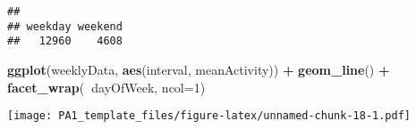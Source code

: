 \documentclass[]{article}
\newenvironment{Shaded}{\begin{snugshade}}{\end{snugshade}}
\newcommand{\DataTypeTok}[1]{\textcolor[rgb]{0.13,0.29,0.53}{#1}}
\newcommand{\DecValTok}[1]{\textcolor[rgb]{0.00,0.00,0.81}{#1}}
\newcommand{\KeywordTok}[1]{\textcolor[rgb]{0.13,0.29,0.53}{\textbf{#1}}}
\newcommand{\NormalTok}[1]{#1}
\newcommand{\OperatorTok}[1]{\textcolor[rgb]{0.81,0.36,0.00}{\textbf{#1}}}
\newcommand{\OtherTok}[1]{\textcolor[rgb]{0.56,0.35,0.01}{#1}}
\newcommand{\StringTok}[1]{\textcolor[rgb]{0.31,0.60,0.02}{#1}}
\begin{document}
\begin{Shaded}
\end{Shaded}

\begin{verbatim}
## 
## weekday weekend 
##   12960    4608
\end{verbatim}

\begin{Shaded}
\end{Shaded}

\begin{Shaded}
\begin{Highlighting}[]
\KeywordTok{ggplot}\NormalTok{(weeklyData, }\KeywordTok{aes}\NormalTok{(interval, meanActivity)) }\OperatorTok{+}\StringTok{ }
\StringTok{    }\KeywordTok{geom_line}\NormalTok{() }\OperatorTok{+}\StringTok{ }
\StringTok{    }\KeywordTok{facet_wrap}\NormalTok{(}\OperatorTok{~}\NormalTok{dayOfWeek, }\DataTypeTok{ncol=}\DecValTok{1}\NormalTok{)}
\end{Highlighting}
\end{Shaded}

\texttt{[image: PA1\_template\_files/figure-latex/unnamed-chunk-18-1.pdf]}
\end{document}
